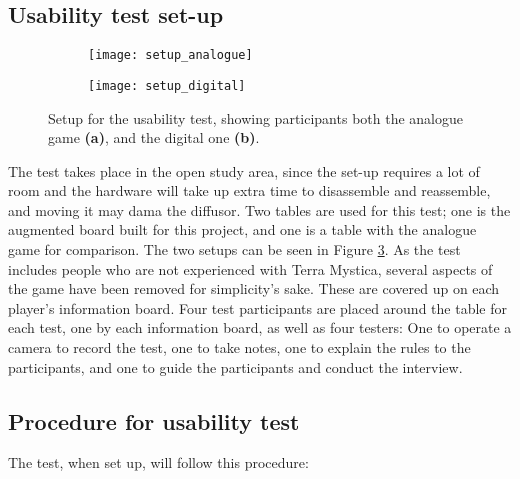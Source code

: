 \subsection{Usability test set-up}
\begin{figure}[!h]
	\centering
	\begin{subfigure}[b]{0.4\textwidth}
	\texttt{[image: setup\_analogue]}
		\caption{\label{Fig:SetupAna}}
	\end{subfigure}
	\begin{subfigure}[b]{0.4\textwidth}
	\texttt{[image: setup\_digital]}
		\caption{\label{Fig:SetupDigi}}
	\end{subfigure}
	\caption{Setup for the usability test, showing participants both the analogue game \textbf{(a)}, and the digital one \textbf{(b)}.\label{Fig:Setup}}
\end{figure}
The test takes place in the open study area, since the set-up requires a lot of room and the hardware will take up extra time to disassemble and reassemble, and moving it may dama the diffusor. Two tables are used for this test; one is the augmented board built for this project, and one is a table with the analogue game for comparison. The two setups can be seen in Figure \ref{Fig:Setup}. As the test includes people who are not experienced with Terra Mystica, several aspects of the game have been removed for simplicity's sake. These are covered up on each player's information board. Four test participants are placed around the table for each test, one by each information board, as well as four testers: One to operate a camera to record the test, one to take notes, one to explain the rules to the participants, and one to guide the participants and conduct the interview.

\subsection{Procedure for usability test}
The test, when set up, will follow this procedure:

